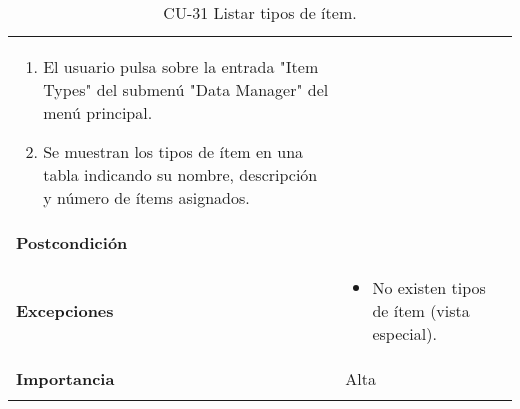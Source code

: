 \begin{longtable}[]{@{}ll@{}}
\begin{minipage}[t]{0.76\columnwidth}
\begin{enumerate}
\def\labelenumi{\arabic{enumi}.}
\tightlist
\item
  El usuario pulsa sobre la entrada "Item Types" del submenú "Data
  Manager" del menú principal.
\item
  Se muestran los tipos de ítem en una tabla indicando su nombre,
  descripción y número de ítems asignados.
\end{enumerate}\strut
\end{minipage}\tabularnewline
\begin{minipage}[t]{0.18\columnwidth}\raggedright
\textbf{Postcondición}\strut
\end{minipage} & \begin{minipage}[t]{0.76\columnwidth}\raggedright
\strut
\end{minipage}\tabularnewline
\begin{minipage}[t]{0.18\columnwidth}\raggedright
\textbf{Excepciones}\strut
\end{minipage} & \begin{minipage}[t]{0.76\columnwidth}\raggedright
\begin{itemize}
\tightlist
\item
  No existen tipos de ítem (vista especial).
\end{itemize}\strut
\end{minipage}\tabularnewline
\begin{minipage}[t]{0.18\columnwidth}\raggedright
\textbf{Importancia}\strut
\end{minipage} & \begin{minipage}[t]{0.76\columnwidth}\raggedright
Alta\strut
\end{minipage}\tabularnewline
\bottomrule
\caption{CU-31 Listar tipos de ítem.}
\end{longtable}

